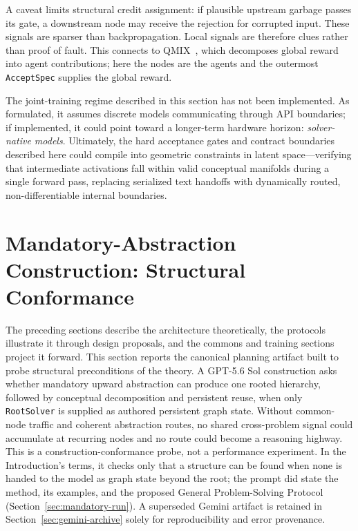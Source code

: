 \documentclass[11pt]{article}
\let\oldtexttt\texttt
\renewcommand{\texttt}[1]{\oldtexttt{\small #1}}
\begin{document}
A caveat limits structural credit assignment: if plausible upstream garbage passes its gate, a downstream node may receive the rejection for corrupted input. These signals are sparser than backpropagation. Local signals are therefore clues rather than proof of fault. This connects to QMIX~\cite{rashid2018qmix}, which decomposes global reward into agent contributions; here the nodes are the agents and the outermost \texttt{AcceptSpec} supplies the global reward.

The joint-training regime described in this section has not been implemented. As formulated, it assumes discrete models communicating through API boundaries; if implemented, it could point toward a longer-term hardware horizon: \emph{solver-native models}. Ultimately, the hard acceptance gates and contract boundaries described here could compile into geometric constraints in latent space---verifying that intermediate activations fall within valid conceptual manifolds during a single forward pass, replacing serialized text handoffs with dynamically routed, non-differentiable internal boundaries.

\section{Mandatory-Abstraction Construction: Structural Conformance}
\label{sec:prototype}

The preceding sections describe the architecture theoretically, the protocols illustrate it through design proposals, and the commons and training sections project it forward. This section reports the canonical planning artifact built to probe structural preconditions of the theory. A GPT-5.6 Sol construction asks whether mandatory upward abstraction can produce one rooted hierarchy, followed by conceptual decomposition and persistent reuse, when only \texttt{RootSolver} is supplied as authored persistent graph state. Without common-node traffic and coherent abstraction routes, no shared cross-problem signal could accumulate at recurring nodes and no route could become a reasoning highway. This is a construction-conformance probe, not a performance experiment. In the Introduction's terms, it checks only that a structure can be found when none is handed to the model as graph state beyond the root; the prompt did state the method, its examples, and the proposed General Problem-Solving Protocol (Section~\ref{sec:mandatory-run}). A superseded Gemini artifact is retained in Section~\ref{sec:gemini-archive} solely for reproducibility and error provenance.
\end{document}
